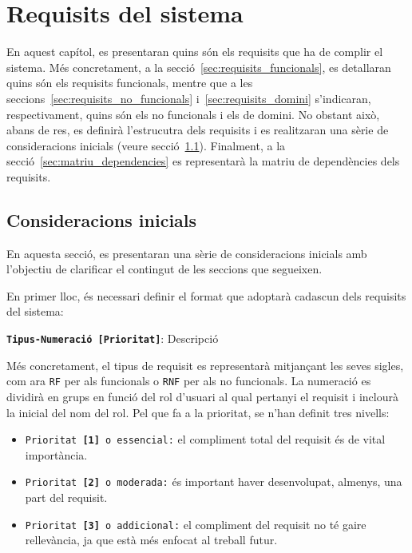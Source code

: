 \documentclass[a4paper,12pt]{ThesisStyle}
\begin{document}
\chapter{Requisits del sistema}
\label{cap:requisits}

En aquest capítol, es presentaran quins són els requisits que ha de complir el sistema. Més concretament, a la secció~\ref{sec:requisits_funcionals}, es detallaran quins són els requisits funcionals, mentre que a les seccions~\ref{sec:requisits_no_funcionals} i~\ref{sec:requisits_domini} s'indicaran, respectivament, quins són els no funcionals i els de domini. No obstant això, abans de res, es definirà l'estrucutra dels requisits i es realitzaran una sèrie de consideracions inicials (veure secció~\ref{sec:consideracions_inicials}). Finalment, a la secció~\ref{sec:matriu_dependencies} es representarà la matriu de dependències dels requisits.

\section{Consideracions inicials}
\label{sec:consideracions_inicials}

En aquesta secció, es presentaran una sèrie de consideracions inicials amb l'objectiu de clarificar el contingut de les seccions que segueixen.

En primer lloc, és necessari definir el format que adoptarà cadascun dels requisits del sistema:
\\[8pt]
\centerline{\texttt{\textbf{Tipus-Numeració [Prioritat]}}: Descripció}

Més concretament, el tipus de requisit es representarà mitjançant les seves sigles, com ara \texttt{RF} per als funcionals o \texttt{RNF} per als no funcionals. La numeració es dividirà en grups en funció del rol d'usuari al qual pertanyi el requisit i inclourà la inicial del nom del rol. Pel que fa a la prioritat, se n'han definit tres nivells:
\begin{itemize}
  \item \texttt{Prioritat \textbf{[1]} o essencial:} el compliment total del requisit és de vital importància.
  \item \texttt{Prioritat \textbf{[2]} o moderada:} és important haver desenvolupat, almenys, una part del requisit.
  \item \texttt{Prioritat \textbf{[3]} o addicional:} el compliment del requisit no té gaire rellevància, ja que està més enfocat al treball futur.
\end{itemize}
\end{document}
